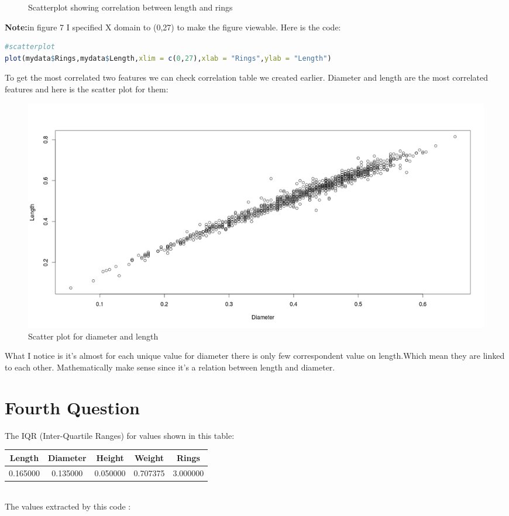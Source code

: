 \documentclass{article}
\begin{document}
\begin{multicols*}{2}
\begin{figure}[H]
\begin{center}
	\end{center}
	\caption{Scatterplot showing correlation between length and rings}
\end{figure}
\textbf{Note:}in figure 7 I specified X domain to (0,27) to make the figure viewable. Here is the code:
\begin{lstlisting}[language=R]
#scatterplot
plot(mydata$Rings,mydata$Length,xlim = c(0,27),xlab = "Rings",ylab = "Length")
\end{lstlisting}
To get the most correlated two features we can check correlation table we created earlier. Diameter and length are the most correlated features and here is the scatter plot for them:
\begin{figure}[H]
	\begin{center}
		\includegraphics[scale=0.22]{scatterplotDiameterLength.png}
	\end{center}
	\caption{Scatter plot for diameter and length}
\end{figure}
What I notice is it's almost for each unique value for diameter there is only few correspondent value on length.Which mean they are linked to each other. Mathematically make sense since it's a relation between length and diameter.
{\centering \section*{Fourth Question}}
The IQR (Inter-Quartile Ranges) for values shown in this table:\\
\begin{tabular}{|c|c|c|c|c|}
	\hline
Length&Diameter&Height&Weight&Rings\\
\hline
0.165000&0.135000&0.050000&0.707375&3.000000\\
\hline
\end{tabular}\\
The values extracted by this code :
\begin{lstlisting}[language=R]

\end{lstlisting}
\end{multicols*}
\end{document}
